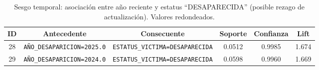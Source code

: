 \begin{table}[H]
\centering
\small
\begin{tabular}{cccccc}
\hline
ID & Antecedente & Consecuente & Soporte & Confianza & Lift \\
\hline
28 & \texttt{AÑO\_DESAPARICION=2025.0} & \texttt{ESTATUS\_VICTIMA=DESAPARECIDA} & 0.0512 & 0.9985 & 1.674 \\
29 & \texttt{AÑO\_DESAPARICION=2024.0} & \texttt{ESTATUS\_VICTIMA=DESAPARECIDA} & 0.0598 & 0.9960 & 1.669 \\
\end{tabular}
\caption{Sesgo temporal: asociación entre año reciente y estatus ``DESAPARECIDA'' (posible rezago de actualización). Valores redondeados.}
\label{tab:sesgo_temporal}
\end{table}